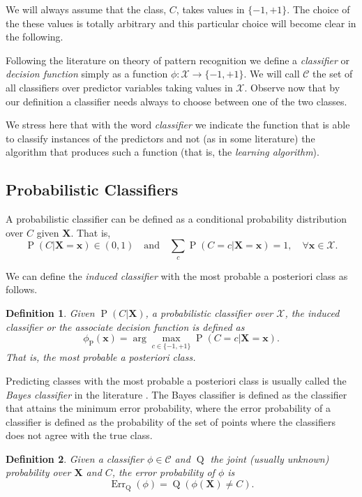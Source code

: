\documentclass[11pt,a4paper, twoside]{book}
\newtheorem{definition}{Definition}[chapter]
\newcommand{\Pp}{\operatorname{P}}
\newcommand{\Pq}{\operatorname{Q}}
\newcommand{\bx}{\mathbf{x}}
\newcommand{\bX}{\mathbf{X}}
\newcommand{\bchi}{\boldsymbol{\mathcal{X}}}
\begin{document}
We will always assume that the class, $C$, takes values in $ \{-1, +1 \}$. The choice of the these values is totally arbitrary and this particular choice will become clear in the following.

Following the literature on theory of pattern recognition \citep{ptpr} we define a  \textit{classifier} or \textit{decision function} simply as a function $\phi: \bchi \to \{-1,+1\}$. We will call $\mathcal{C}$ the set of all classifiers over predictor variables taking values in $\bchi$. 
Observe now that by our definition a classifier needs always to choose between one of the two classes.

We stress here that with the word \textit{classifier} we indicate the function that is able to classify instances of the predictors and not (as in some literature) the {algorithm} that produces such a function (that is, the \textit{learning algorithm}).

\subsection{Probabilistic Classifiers}

A probabilistic classifier can be defined as a conditional probability distribution over $C$ given $\bX$. That is,
$$ \Pp(C | \bX = \bx) \in (0,1) \quad \text{and} \quad \sum_{c} \Pp(C=c | \bX = \bx) = 1, \quad \forall \bx \in \bchi .$$

We can define the \textit{induced classifier} with the most probable a posteriori class as follows.
\begin{definition}
Given $\Pp(C|\bX)$, a probabilistic classifier over $\bchi$, the induced classifier or the associate decision function is defined as
$$ \phi_{\Pp}(\bx) = \arg \max_{c \in \{-1,+1\}} \Pp(C=c|\bX = \bx).$$
That is, the most probable a posteriori class. 
\end{definition} 
Predicting classes with the most probable a posteriori class is usually called the \textit{Bayes classifier} in the literature \citep{Duda2000,ptpr}.
The Bayes classifier is defined as the classifier that attains the minimum error probability, where the error  probability of a classifier is defined as the probability of the set of points where the classifiers does not agree with the true class.

\begin{definition}
\label{def:errprob}
Given a classifier $\phi \in \mathcal{C}$ and $\Pq$ the joint (usually unknown) probability over $\bX$ and $C$, the error probability of $\phi$ is 
$$ \operatorname{Err}_{\Pq}(\phi)=\Pq\left( \phi(\bX) \neq C \right).$$  
\end{definition}
\end{document}
